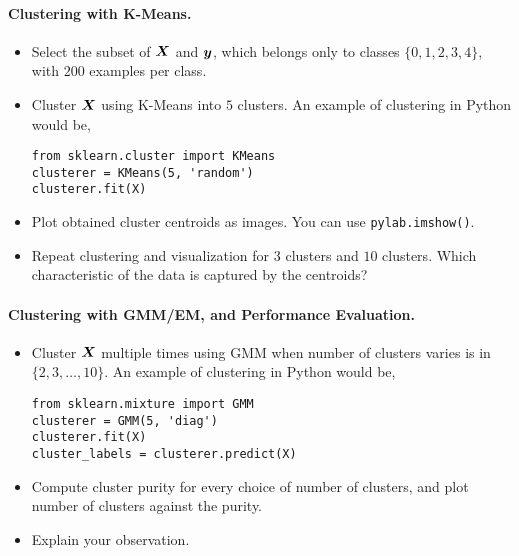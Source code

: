 \documentclass{article}
\begin{document}
\paragraph{Clustering with K-Means.}
\begin{itemize}
\item Select the subset of $\boldsymbol{X}$ and $\boldsymbol{y}$, which belongs only to classes $\{0,1,2,3,4\}$, with $200$ examples per class.
\item Cluster $\boldsymbol{X}$ using K-Means into $5$ clusters.
An example of clustering in Python would be,
\begin{lstlisting}
from sklearn.cluster import KMeans
clusterer = KMeans(5, 'random')
clusterer.fit(X)
\end{lstlisting}
\item Plot obtained cluster centroids as images. You can use \verb!pylab.imshow()!.
\item Repeat clustering and visualization for $3$ clusters and $10$ clusters. Which characteristic of the data is captured by the centroids?
\end{itemize}

\paragraph{Clustering with GMM/EM, and Performance Evaluation.}
\begin{itemize}
\item Cluster $\boldsymbol{X}$ multiple times using GMM when number of clusters varies is in $\{2, 3, \ldots, 10\}$.
An example of clustering in Python would be,
\begin{lstlisting}
from sklearn.mixture import GMM
clusterer = GMM(5, 'diag')
clusterer.fit(X)
cluster_labels = clusterer.predict(X)
\end{lstlisting}
\item Compute cluster purity for every choice of number of clusters, and plot number of clusters against the purity.
\item Explain your observation.
\end{itemize}
\end{document}
